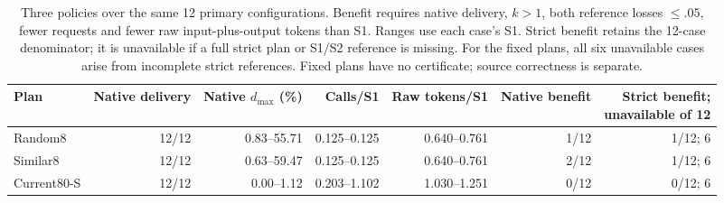 \begin{table}[t]
\centering\small
\caption{Three policies over the same 12 primary configurations. Benefit requires native delivery, $k>1$, both reference losses $\le.05$, fewer requests and fewer raw input-plus-output tokens than S1. Ranges use each case's S1. Strict benefit retains the 12-case denominator; it is unavailable if a full strict plan or S1/S2 reference is missing. For the fixed plans, all six unavailable cases arise from incomplete strict references. Fixed plans have no certificate; source correctness is separate.}
\label{tab:policy_summary}
\begin{tabular}{lrrrrrr}
\toprule
Plan & Native delivery & Native $d_{\max}$ (\%) & Calls/S1 & Raw tokens/S1 & Native benefit & \shortstack{Strict benefit;\\unavailable of 12} \\
\midrule
Random8 & 12/12 & 0.83--55.71 & 0.125--0.125 & 0.640--0.761 & 1/12 & 1/12; 6 \\
Similar8 & 12/12 & 0.63--59.47 & 0.125--0.125 & 0.640--0.761 & 2/12 & 1/12; 6 \\
Current80-S & 12/12 & 0.00--1.12 & 0.203--1.102 & 1.030--1.251 & 0/12 & 0/12; 6 \\
\bottomrule
\end{tabular}
\end{table}
